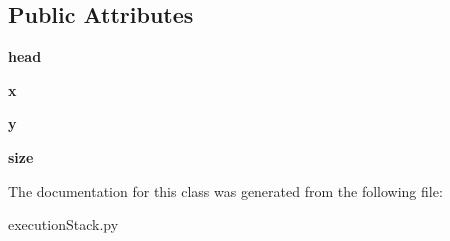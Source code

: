 \subsection*{Public Attributes}
\begin{DoxyCompactItemize}
\item 
\mbox{\label{classexecution_stack_1_1_function_stack_abf6bc25315b9d735a55a80310fe9a347}} 
{\bfseries head}
\item 
\mbox{\label{classexecution_stack_1_1_function_stack_ad6baee6eaaab85973dc70879f855be46}} 
{\bfseries x}
\item 
\mbox{\label{classexecution_stack_1_1_function_stack_ab224771bd639966a3972d9c72d7a7718}} 
{\bfseries y}
\item 
\mbox{\label{classexecution_stack_1_1_function_stack_a07903b626e71099c692b91655aee20da}} 
{\bfseries size}
\end{DoxyCompactItemize}


The documentation for this class was generated from the following file\+:\begin{DoxyCompactItemize}
\item 
execution\+Stack.\+py\end{DoxyCompactItemize}
